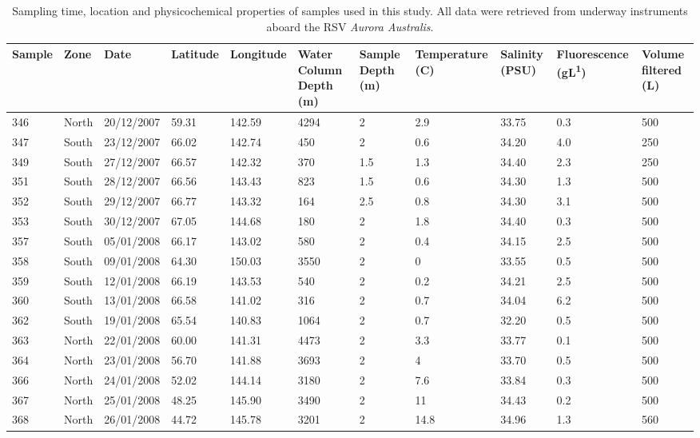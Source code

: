 \begin{sidewaystable}
\sffamily
\caption[Details of samples used in Polar Front study]{\sffamily{}Sampling time, location and physicochemical properties of samples used in this study.
All data were retrieved from underway instruments aboard the RSV \textit{Aurora Australis}.}
\label{tab:samplelist}
\begin{tabularx}{\textheight}{lllXXXXXXXX}
\toprule
\textbf{Sample} & \textbf{Zone} & \textbf{Date} & \textbf{Latitude} & \textbf{Longitude} & \textbf{Water \linebreak Column \linebreak Depth (m)} & \textbf{Sample Depth (m)} & \textbf{Temperature (\textdegree{}C)} & \textbf{Salinity (PSU)} & \textbf{Fluorescence \linebreak (\textmu{}gL\textsuperscript{\textminus{}1})} & \textbf{Volume \linebreak filtered (L)}\\
\midrule

346 & North & 20/12/2007 & \textminus{}59.31 & 142.59 & 4294 & 2 & 2.9 & 33.75 & 0.3 & 500\\
347 & South & 23/12/2007 & \textminus{}66.02 & 142.74 & 450 & 2 & 0.6 & 34.20 & 4.0 & 250\\
349 & South & 27/12/2007 & \textminus{}66.57 & 142.32 & 370 & 1.5 & \textminus{}1.3 & 34.40 & 2.3 & 250\\
351 & South & 28/12/2007 & \textminus{}66.56 & 143.43 & 823 & 1.5 & \textminus{}0.6 & 34.30 & 1.3 & 500\\
352 & South & 29/12/2007 & \textminus{}66.77 & 143.32 & 164 & 2.5 & \textminus{}0.8 & 34.30 & 3.1 & 500\\
353 & South & 30/12/2007 & \textminus{}67.05 & 144.68 & 180 & 2 & \textminus{}1.8 & 34.40 & 0.3 & 500\\
357 & South & 05/01/2008 & \textminus{}66.17 & 143.02 & 580 & 2 & \textminus{}0.4 & 34.15 & 2.5 & 500\\
358 & South & 09/01/2008 & \textminus{}64.30 & 150.03 & 3550 & 2 & 0 & 33.55 & 0.5 & 500\\
359 & South & 12/01/2008 & \textminus{}66.19 & 143.53 & 540 & 2 & \textminus{}0.2 & 34.21 & 2.5 & 500\\
360 & South & 13/01/2008 & \textminus{}66.58 & 141.02 & 316 & 2 & \textminus{}0.7 & 34.04 & 6.2 & 500\\
362 & South & 19/01/2008 & \textminus{}65.54 & 140.83 & 1064 & 2 & 0.7 & 32.20 & 0.5 & 500\\
363 & North & 22/01/2008 & \textminus{}60.00 & 141.31 & 4473 & 2 & 3.3 & 33.77 & 0.1 & 500\\
364 & North & 23/01/2008 & \textminus{}56.70 & 141.88 & 3693 & 2 & 4 & 33.70 & 0.5 & 500\\
366 & North & 24/01/2008 & \textminus{}52.02 & 144.14 & 3180 & 2 & 7.6 & 33.84 & 0.3 & 500\\
367 & North & 25/01/2008 & \textminus{}48.25 & 145.90 & 3490 & 2 & 11 & 34.43 & 0.2 & 500\\
368 & North & 26/01/2008 & \textminus{}44.72 & 145.78 & 3201 & 2 & 14.8 & 34.96 & 1.3 & 560\\

\bottomrule
\end{tabularx}
\end{sidewaystable}
